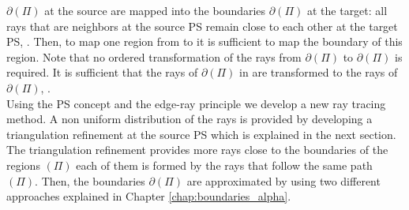 $\partial$$(\Pi)$ at the source are mapped into the boundaries $\partial$$(\Pi)$ at the target:
all rays that are neighbors at the source PS remain close to each other at the target PS, .
Then, to map one region from  to  it is sufficient to map the boundary of this region. 
Note that no ordered transformation of the rays from $\partial$$(\Pi)$ to $\partial$$(\Pi)$ is required. 
It is sufficient that the rays of  $\partial$$(\Pi)$ in are transformed to the rays of $\partial$$(\Pi)$, \cite{minano1992new}. 
\\ \indent Using the PS concept and the edge-ray principle we develop a new ray tracing method. 
A non uniform distribution of the rays is provided by developing a triangulation refinement at the source PS which is explained in the next section. 
The triangulation refinement provides more rays close to the boundaries of the regions $(\Pi)$ each of them is formed by the rays that follow the same path $(\Pi)$.
Then, the boundaries $\partial$$(\Pi)$ are approximated by using two different approaches explained in Chapter \ref{chap:boundaries_alpha}.
